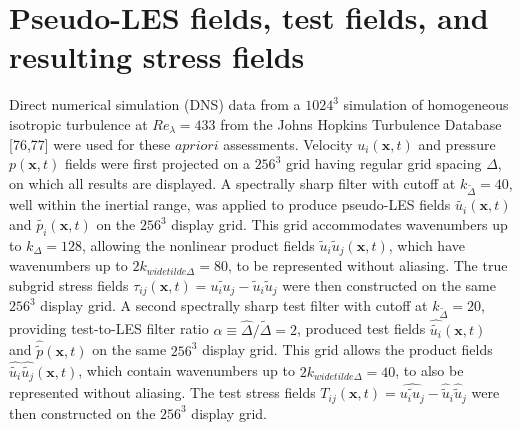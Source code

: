 \section{Pseudo-LES fields, test fields, and resulting stress fields} 

Direct numerical simulation (DNS) data from a $1024^3$ simulation of homogeneous isotropic turbulence at $ Re_{\lambda} = 433$ from the Johns Hopkins Turbulence Database [76,77] were used for these $a priori$ assessments. Velocity $u_i(\mathbf{x},t)$  and pressure  $p(\mathbf{x},t)$ fields were first projected on a $256^3$ grid having regular grid spacing $\Delta$, on which all results are displayed. A spectrally sharp filter with cutoff at $k_{\widetilde{\Delta}} = 40$, well within the inertial range, was applied to produce pseudo-LES fields $\widetilde{u_i}(\mathbf{x},t)$ and $\widetilde{p_i}(\mathbf{x},t)$   on the $256^3$ display grid. This grid accommodates wavenumbers up to  $k_{\Delta} = 128$, allowing the nonlinear product fields $\widetilde{u}_i \widetilde{u}_j (\mathbf{x},t)$, which have wavenumbers up to $2k_{widetilde{\Delta}}= 80$, to be represented without aliasing. The true subgrid stress fields $\tau_{ij}(\mathbf{x},t) = \widetilde{u_iu_j} - \widetilde{u}_i \widetilde{u}_j$  were then constructed on the same $256^3$ display grid. A second spectrally sharp test filter with cutoff at  $k_{\widetilde{\Delta}}= 20$, providing test-to-LES filter ratio  $\alpha \equiv \widehat{\Delta}/\widetilde{\Delta}= 2$, produced test fields $\widehat{\widetilde{u_i}}(\mathbf{x},t)$   and  $\widehat{\widetilde{p}}(\mathbf{x},t)$ on the same $256^3$ display grid. This grid allows the product fields $\widehat{\widetilde{u_i}}\widehat{\widetilde{u_j}}(\mathbf{x},t)$, which contain wavenumbers up to $2k_{widetilde{\Delta}}= 40$, to also be represented without aliasing. The test stress fields  $T_{ij}(\mathbf{x},t) = \widehat{\widetilde{u_iu_j}} - \widehat{\widetilde{u}}_i \widehat{\widetilde{u}}_j$  were then constructed on the $256^3$ display grid.

